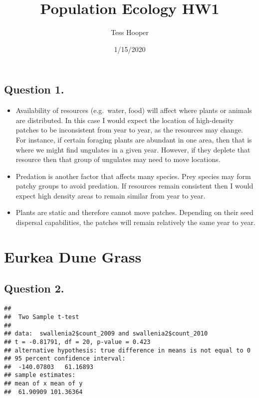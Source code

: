 \documentclass[]{article}
\title{Population Ecology HW1}
\author{Tess Hooper}
\date{1/15/2020}
\begin{document}
\maketitle

\hypertarget{question-1.}{%
\subsection{Question 1.}\label{question-1.}}

\begin{itemize}
\item
  Availability of resources (e.g.~water, food) will affect where plants
  or animals are distributed. In this case I would expect the location
  of high-density patches to be inconsistent from year to year, as the
  resources may change. For instance, if certain foraging plants are
  abundant in one area, then that is where we might find ungulates in a
  given year. However, if they deplete that resource then that group of
  ungulates may need to move locations.
\item
  Predation is another factor that affects many species. Prey species
  may form patchy groups to avoid predation. If resources remain
  consistent then I would expect high density areas to remain similar
  from year to year.
\item
  Plants are static and therefore cannot move patches. Depending on
  their seed dispersal capabilities, the patches will remain relatively
  the same year to year.
\end{itemize}

\hypertarget{eurkea-dune-grass}{%
\section{Eurkea Dune Grass}\label{eurkea-dune-grass}}

\hypertarget{question-2.}{%
\subsection{Question 2.}\label{question-2.}}

\begin{verbatim}
## 
##  Two Sample t-test
## 
## data:  swallenia2$count_2009 and swallenia2$count_2010
## t = -0.81791, df = 20, p-value = 0.423
## alternative hypothesis: true difference in means is not equal to 0
## 95 percent confidence interval:
##  -140.07803   61.16893
## sample estimates:
## mean of x mean of y 
##  61.90909 101.36364
\end{verbatim}
\end{document}

